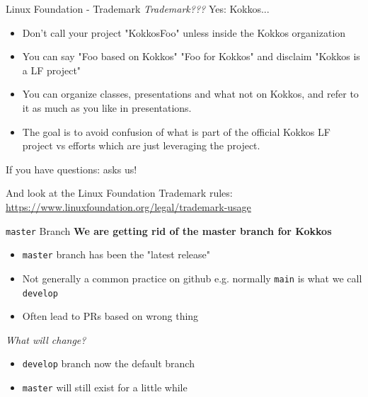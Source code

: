 \begin{frame}[fragile]{Linux Foundation - Trademark}
\textit{Trademark???} Yes: Kokkos\texttrademark ...
\begin{itemize}
\item Don't call your project "KokkosFoo" unless inside the Kokkos organization
\item You can say "Foo based on Kokkos" "Foo for Kokkos" and disclaim "Kokkos is a LF project"
\item You can organize classes, presentations and what not on Kokkos, and refer to it as much as you like in presentations.
\item The goal is to avoid confusion of what is part of the official Kokkos LF project vs efforts which are just leveraging the project.
\end{itemize}

If you have questions: asks us!

And look at the Linux Foundation Trademark rules: \url{https://www.linuxfoundation.org/legal/trademark-usage}
\end{frame}

\begin{frame}[fragile]{\texttt{master} Branch}
\textbf{We are getting rid of the master branch for Kokkos}

\begin{itemize}
\item{\texttt{master} branch has been the "latest release"}
\item{Not generally a common practice on github e.g. normally \texttt{main} is what we call \texttt{develop}}
\item{Often lead to PRs based on wrong thing}
\end{itemize}

\textit{What will change?}

\begin{itemize}
\item{\texttt{develop} branch now the default branch}
\item{\texttt{master} will still exist for a little while}
\end{itemize}

\end{frame}

